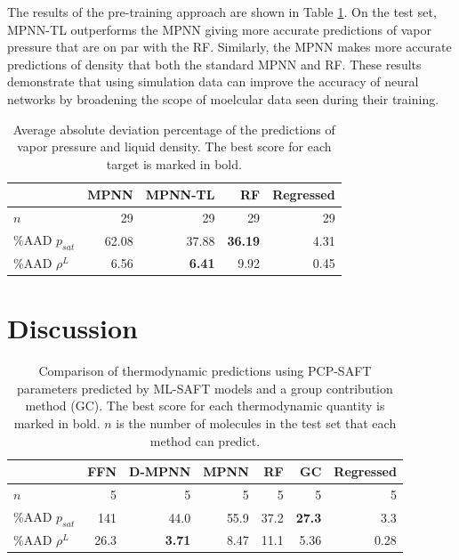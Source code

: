 The results of the pre-training approach are shown in Table \ref{tab:scores_tl}. On the test set, MPNN-TL outperforms the MPNN giving more accurate predictions of vapor pressure that are on par with the RF. Similarly, the MPNN makes more accurate predictions of density that both the standard MPNN and RF. These results demonstrate that using simulation data can improve the accuracy of neural networks by broadening the scope of moelcular data seen during their training. 

\begin{table}
    \caption{Average absolute deviation percentage of the predictions of vapor pressure and liquid density. The best score for each target is marked in bold.}
    \begin{center}
        \begin{tabular}{lrrr|r}
             & MPNN & MPNN-TL & RF & Regressed \\
            \hline
            $n$ & 29 & 29 & 29 & 29 \\
            \%AAD $p_{sat}$ & 62.08 & 37.88 & \textbf{36.19} & 4.31 \\
            \%AAD $\rho^{L}$ & 6.56 & \textbf{6.41} & 9.92 & 0.45 \\
        \end{tabular}
    \end{center}
    \label{tab:scores_tl}
\end{table}


\section{Discussion}

\begin{table}
	\caption{Comparison of thermodynamic predictions using PCP-SAFT parameters predicted by ML-SAFT models and a group contribution method (GC).\cite{Sauer2014} The best score for each thermodynamic quantity  is marked in bold. $n$ is the number of molecules in the test set that each method can predict.}
    \label{tab:gc}
	\begin{center}
    	\begin{tabular}{lrrrrr|r}
    		 & FFN & D-MPNN & MPNN & RF & GC & Regressed \\
    		\hline
    		$n$ & 5 & 5 & 5 & 5 & 5 & 5 \\
    		\%AAD $p_{sat}$ & 141 & 44.0 & 55.9 & 37.2 & \textbf{27.3} & 3.3 \\
    		\%AAD $\rho^{L}$ & 26.3 & \textbf{3.71} & 8.47 & 11.1 & 5.36 & 0.28 \\
    	\end{tabular}
	\end{center}
\end{table}

